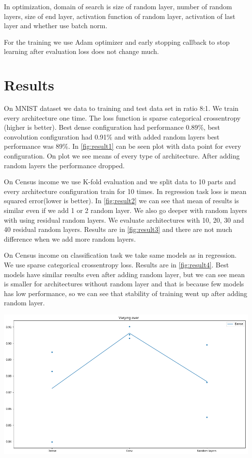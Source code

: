 \documentclass[]{article}
\newenvironment{Figure}
{\par\medskip\noindent\minipage{\linewidth}}
{\endminipage\par\medskip}
\begin{document}
\begin{multicols}{2}
	In optimization, domain of search is size of random layer, number of random layers, size of end layer, activation function of random layer, activation of last layer and whether use batch norm.	
	
	For the training we use Adam optimizer and early stopping callback to stop learning after evaluation loss does not change much.
	
	\section{Results}
	On MNIST dataset we data to training and test data set in ratio 8:1. We train every architecture one time. The loss function is sparse categorical crossentropy (higher is better). Best dense configuration had performance 0.89\%, best convolution configuration had 0.91\% and with added random layers best performance was 89\%. In \ref{fig:result1} can be seen plot with data point for every configuration. On plot we see means of every type of architecture. After adding random layers the performance dropped.
	
	On Census income we use K-fold evaluation and we split data to 10 parts and every architecture configuration train for 10 times. In regression task loss is mean squared error(lower is better). In \ref{fig:result2} we can see that mean of results is similar even if we add 1 or 2 random layer. We also go deeper with random layers with using residual random layers. We evaluate architectures with 10, 20, 30 and 40 residual random layers. Results are in \ref{fig:result3} and there are not much difference when we add more random layers.
	
	On Census income on classification task we take same models as in regression. We use sparse categorical crossentropy loss. Results are in \ref{fig:result4}. Best models have similar results even after adding random layer, but we can see mean is smaller for architectures without random layer and that is because few models has low performance, so we can see that stability of training went up after adding random layer.	
	
	\begin{Figure}
		\centering
		\includegraphics[width=\linewidth]{figure1.png}
		\label{fig:result1}
	\end{Figure}


\end{multicols}
\end{document}
